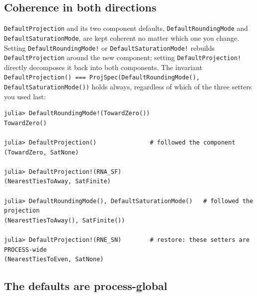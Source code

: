 \subsection{Coherence in both directions}



\label{18340556388588567673}{}


\texttt{DefaultProjection} and its two component defaults, \texttt{DefaultRoundingMode} and \texttt{DefaultSaturationMode}, are kept coherent no matter which one you change. Setting \texttt{DefaultRoundingMode!} or \texttt{DefaultSaturationMode!} rebuilds \texttt{DefaultProjection} around the new component; setting \texttt{DefaultProjection!} directly decomposes it back into both components. The invariant \texttt{DefaultProjection(\allowbreak{}) === ProjSpec(\allowbreak{}DefaultRoundingMode(\allowbreak{}), DefaultSaturationMode(\allowbreak{}))} holds always, regardless of which of the three setters you used last:




\nopagebreak[4]
\begin{verbatim}
julia> DefaultRoundingMode!(TowardZero())
TowardZero()

julia> DefaultProjection()               # followed the component
(TowardZero, SatNone)

julia> DefaultProjection!(RNA_SF)
(NearestTiesToAway, SatFinite)

julia> DefaultRoundingMode(), DefaultSaturationMode()   # followed the projection
(NearestTiesToAway(), SatFinite())

julia> DefaultProjection!(RNE_SN)        # restore: these setters are PROCESS-wide
(NearestTiesToEven, SatNone)
\end{verbatim}



\subsection{The defaults are process-global}



\label{5299094382095427161}{}


